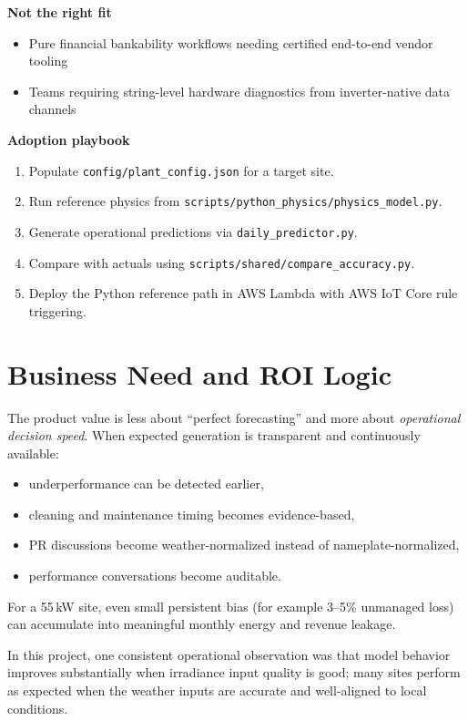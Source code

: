 \documentclass[11pt,a4paper]{article}
\newcommand{\artifact}[1]{\texttt{#1}}
\begin{document}
\textbf{Not the right fit}
\begin{itemize}
  \item Pure financial bankability workflows needing certified end-to-end vendor tooling
  \item Teams requiring string-level hardware diagnostics from inverter-native data channels
\end{itemize}

\textbf{Adoption playbook}
\begin{enumerate}
  \item Populate \artifact{config/plant\_config.json} for a target site.
  \item Run reference physics from \artifact{scripts/python\_physics/physics\_model.py}.
  \item Generate operational predictions via \artifact{daily\_predictor.py}.
  \item Compare with actuals using \artifact{scripts/shared/compare\_accuracy.py}.
  \item Deploy the Python reference path in AWS Lambda with AWS IoT Core rule triggering.
\end{enumerate}

\section{Business Need and ROI Logic}

The product value is less about ``perfect forecasting'' and more about \textit{operational decision speed}.
When expected generation is transparent and continuously available:
\begin{itemize}
  \item underperformance can be detected earlier,
  \item cleaning and maintenance timing becomes evidence-based,
  \item PR discussions become weather-normalized instead of nameplate-normalized,
  \item performance conversations become auditable.
\end{itemize}

For a 55\,kW site, even small persistent bias (for example 3--5\% unmanaged loss) can accumulate into meaningful monthly energy and revenue leakage.

In this project, one consistent operational observation was that model behavior improves substantially when irradiance input quality is good; many sites perform as expected when the weather inputs are accurate and well-aligned to local conditions.
\end{document}
